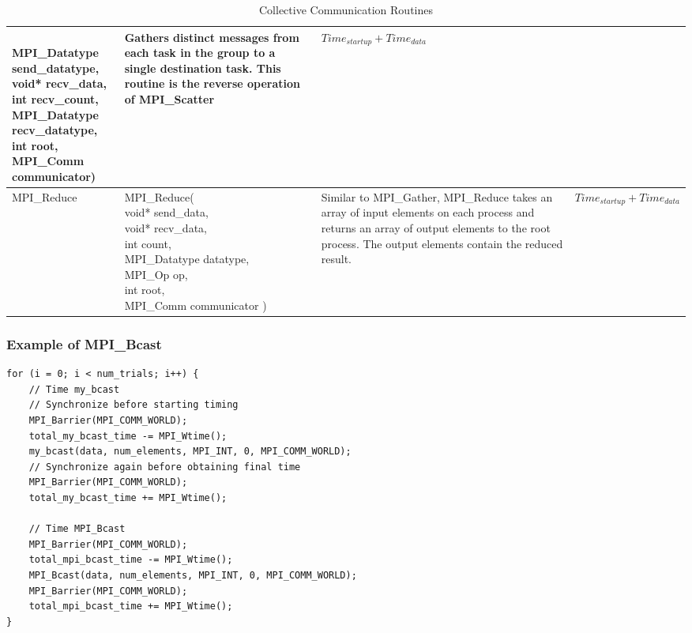 \begin{table}[h]
\begin{tabular}{l | p{5.5cm} | p{5cm} | p{4cm}}
{                \\ MPI\_Datatype send\_datatype,
                \\ void* recv\_data,
                \\ int recv\_count,
                \\ MPI\_Datatype recv\_datatype,
                \\ int root,
                \\ MPI\_Comm communicator)
            }
            & Gathers distinct messages from each task in the group to a single destination task. This routine is the reverse operation of MPI\_Scatter
            & $ Time_{startup} + Time_{data} $
        \\ \hline
            MPI\_Reduce
            & \makecell[tl]{
                MPI\_Reduce(
                    \\ void* send\_data,
                    \\ void* recv\_data,
                    \\ int count,
                    \\ MPI\_Datatype datatype,
                    \\ MPI\_Op op,
                    \\ int root,
                    \\ MPI\_Comm communicator
                )
            }
            & Similar to MPI\_Gather, MPI\_Reduce takes an array of input elements on each process and returns an array of output elements to the root process. The output elements contain the reduced result.
            & $ Time_{startup} + Time_{data} $
    \end{tabular}
    \caption{Collective Communication Routines}
    \label{tab:CollectiveCommunicationRoutines}
\end{table}


\subsubsection*{Example of MPI\_Bcast}
\begin{verbatim}
for (i = 0; i < num_trials; i++) {
    // Time my_bcast
    // Synchronize before starting timing
    MPI_Barrier(MPI_COMM_WORLD);
    total_my_bcast_time -= MPI_Wtime();
    my_bcast(data, num_elements, MPI_INT, 0, MPI_COMM_WORLD);
    // Synchronize again before obtaining final time
    MPI_Barrier(MPI_COMM_WORLD);
    total_my_bcast_time += MPI_Wtime();
    
    // Time MPI_Bcast
    MPI_Barrier(MPI_COMM_WORLD);
    total_mpi_bcast_time -= MPI_Wtime();
    MPI_Bcast(data, num_elements, MPI_INT, 0, MPI_COMM_WORLD);
    MPI_Barrier(MPI_COMM_WORLD);
    total_mpi_bcast_time += MPI_Wtime();
}
\end{verbatim}

